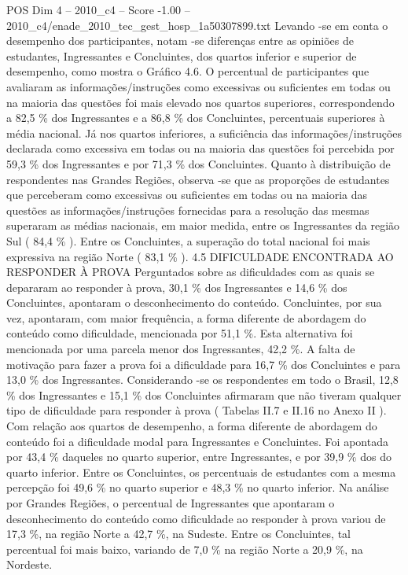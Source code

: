 \begin{textsample}{POS Dim 4 – 2010\_c4 – Score -1.00 – 2010\_c4/enade\_2010\_tec\_gest\_hosp\_1a50307899.txt}
Levando -se em conta o desempenho dos participantes, notam -se diferenças entre as opiniões de estudantes, Ingressantes e Concluintes, dos quartos inferior e superior de desempenho, como mostra o Gráfico 4.6.
O percentual de participantes que avaliaram as informações/instruções como excessivas ou suficientes em todas ou na maioria das questões foi mais elevado nos quartos superiores, correspondendo a 82,5 \% dos Ingressantes e a 86,8 \% dos Concluintes, percentuais superiores à média nacional.
Já nos quartos inferiores, a suficiência das informações/instruções declarada como excessiva em todas ou na maioria das questões foi percebida por 59,3 \% dos Ingressantes e por 71,3 \% dos Concluintes.
Quanto à distribuição de respondentes nas Grandes Regiões, observa -se que as proporções de estudantes que perceberam como excessivas ou suficientes em todas ou na maioria das questões as informações/instruções fornecidas para a resolução das mesmas superaram as médias nacionais, em maior medida, entre os Ingressantes da região Sul ( 84,4 \% ).
Entre os Concluintes, a superação do total nacional foi mais expressiva na região Norte ( 83,1 \% ). 4.5 DIFICULDADE ENCONTRADA AO RESPONDER À PROVA Perguntados sobre as dificuldades com as quais se depararam ao responder à prova, 30,1 \% dos Ingressantes e 14,6 \% dos Concluintes, apontaram o desconhecimento do conteúdo.
Concluintes, por sua vez, apontaram, com maior frequência, a forma diferente de abordagem do conteúdo como dificuldade, mencionada por 51,1 \%.
Esta alternativa foi mencionada por uma parcela menor dos Ingressantes, 42,2 \%.
A falta de motivação para fazer a prova foi a dificuldade para 16,7 \% dos Concluintes e para 13,0 \% dos Ingressantes.
Considerando -se os respondentes em todo o Brasil, 12,8 \% dos Ingressantes e 15,1 \% dos Concluintes afirmaram que não tiveram qualquer tipo de dificuldade para responder à prova ( Tabelas II.7 e II.16 no Anexo II ).
Com relação aos quartos de desempenho, a forma diferente de abordagem do conteúdo foi a dificuldade modal para Ingressantes e Concluintes.
Foi apontada por 43,4 \% daqueles no quarto superior, entre Ingressantes, e por 39,9 \% dos do quarto inferior.
Entre os Concluintes, os percentuais de estudantes com a mesma percepção foi 49,6 \% no quarto superior e 48,3 \% no quarto inferior.
Na análise por Grandes Regiões, o percentual de Ingressantes que apontaram o desconhecimento do conteúdo como dificuldade ao responder à prova variou de 17,3 \%, na região Norte a 42,7 \%, na Sudeste.
Entre os Concluintes, tal percentual foi mais baixo, variando de 7,0 \% na região Norte a 20,9 \%, na Nordeste.

\end{textsample}

